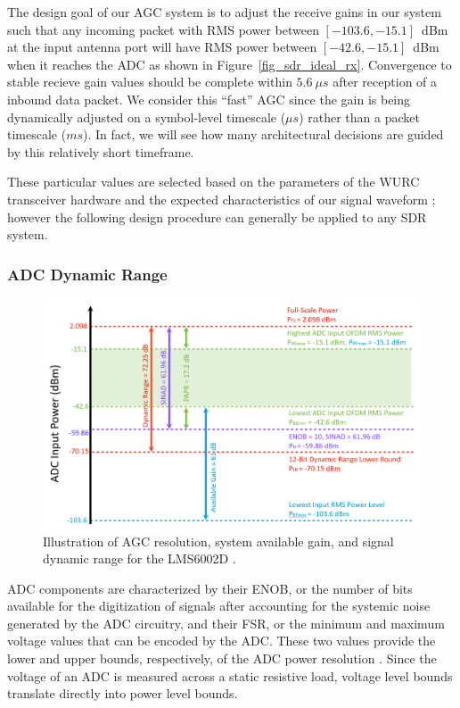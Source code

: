 The design goal of our \ac{AGC} system is to adjust the receive gains in our system such that any incoming packet with \ac{RMS} power between $[-103.6, -15.1]$~dBm at the input antenna port will have \ac{RMS} power between $[-42.6, -15.1]$~dBm when it reaches the \ac{ADC} as shown in Figure~\ref{fig_sdr_ideal_rx}.
Convergence to stable recieve gain values should be complete within $5.6~\mu s$ after reception of a inbound data packet.
We consider this ``fast'' \ac{AGC} since the gain is being dynamically adjusted on a symbol-level timescale ($\mu s$) rather than a packet timescale ($ms$).
In fact, we will see how many architectural decisions are guided by this relatively short timeframe.

These particular values are selected based on the parameters of the \ac{WURC} transceiver hardware \cite{lime2012lms6002d} and the expected characteristics of our signal waveform \cite{perahia2013next}; however the following design procedure can generally be applied to any \ac{SDR} system.

\subsubsection{ADC Dynamic Range}
\label{sec_adc_dyn_range}

\begin{figure}[h] %
\centering
\includegraphics[width=1\linewidth]{./figs/agc/agc_dynamic_range}
\caption{Illustration of AGC resolution, system available gain, and signal dynamic range for the LMS6002D \cite{lime2012lms6002d}.}
\label{fig_agc_dynamic_range}
\end{figure}

\ac{ADC} components are characterized by their \ac{ENOB}, or the number of bits available for the digitization of signals after accounting for the systemic noise generated by the \ac{ADC} circuitry, and their \ac{FSR}, or the minimum and maximum voltage values that can be encoded by the \ac{ADC}.
These two values provide the lower and upper bounds, respectively, of the \ac{ADC} power resolution \cite{adi2008sinad}.
Since the voltage of an \ac{ADC} is measured across a static resistive load, voltage level bounds translate directly into power level bounds.

